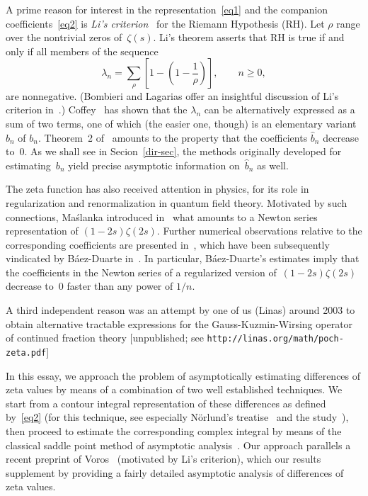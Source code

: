 \documentclass{amsart}
\def\hat{\widehat}
\begin{document}

A prime reason for  interest in the representation~\eqref{eq1} and the
companion           coefficients~\eqref{eq2}         is     \emph{Li's
criterion}~\cite{Li97} for the   Riemann Hypothesis (RH).   Let $\rho$
range over the  nontrivial zeros of~$\zeta(s)$.   Li's theorem asserts
that RH is true if and only if all members of the sequence
\[
\lambda_n=\sum_\rho \left[1-\left(1-\frac{1}{\rho}\right)\right], \qquad n\ge0,
\]
are nonnegative. (Bombieri and Lagarias
 offer an insightful discussion of Li's criterion in~\cite{BoLa99}.) 
Coffey~\cite{Coffey05} has shown that the $\lambda_n$
can be alternatively  expressed as a  sum of  two terms, one  of which
(the easier one, though) is an elementary variant $\hat b_n$ of $b_n$.
Theorem~2 of~\cite{Coffey05}  amounts to the property that the coefficients $\hat b_n$ 
decrease to~0. As we shall see in Secion~\ref{dir-sec},
the methods originally developed for estimating~$b_n$
yield precise asymptotic information on~$\hat b_n$ as well.

The zeta function has also received attention in physics,
for its role in regularization and renormalization in 
quantum field theory. 
Motivated by such connections, 
Ma\'slanka introduced in~\cite{Maslanka01} 
what amounts to a Newton series representation of $(1-2s)\zeta(2s)$.
Further numerical observations relative to the corresponding coefficients
are presented in~\cite{Maslanka04}, which
have been subsequently vindicated by B\'aez-Duarte in~\cite{Baez03}.
In particular, B\'aez-Duarte's estimates imply that the coefficients
in the Newton series of a regularized version of~$(1-2s)\zeta(2s)$ decrease to~0
faster than any power of $1/n$.

A third independent reason was an attempt by one of us (Linas) around 2003 to obtain
alternative tractable expressions for the Gauss-Kuzmin-Wirsing operator of 
continued fraction theory [unpublished; see
\verb|http://linas.org/math/poch-zeta.pdf|]

In this essay,  we  approach the problem of  asymptotically estimating
differences of  zeta  values by means of   a combination  of  two well
established   techniques.   We   start   from   a   contour   integral
representation of these  differences as defined by~\eqref{eq2}  (for this
technique, see   especially N\"orlund's treatise~\cite{Norlund54}  and
the study~\cite{FlSe95}),  then proceed to estimate the corresponding
complex  integral by  means of the classical  saddle point method of asymptotic
analysis~\cite{deBruijn81,Olver74}. Our approach parallels a recent  preprint
of Voros~\cite{Voros05} (motivated by Li's criterion), 
which our results supplement by providing a fairly 
detailed asymptotic analysis of differences of zeta values.
\end{document}
